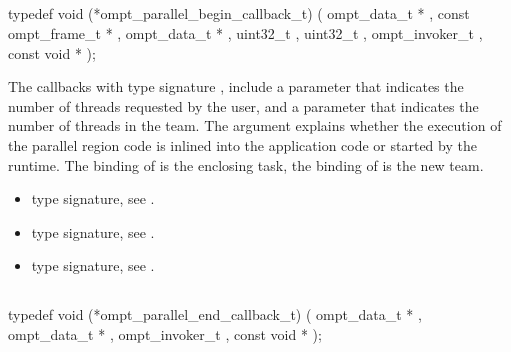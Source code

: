 \subsection{}
\label{subsec:ompt_parallel_begin_callback_t}
\format
\begin{boxedcode}
typedef void (*ompt\_parallel\_begin\_callback\_t) (
               ompt\_data\_t * ,
               const ompt\_frame\_t * ,
               ompt\_data\_t * ,
               uint32\_t ,
               uint32\_t ,
               ompt\_invoker\_t ,
               const void * 
);
\end{boxedcode}

\descr
The callbacks with type signature ,
include a parameter 
that indicates the number of threads requested by the user, and a parameter
 that indicates the number of threads in the team.
The  argument explains whether the execution of the parallel
region code is inlined into the application code or started by the runtime.
The binding of  is the enclosing task, the binding of
 is the new team.


\crossreferences
\begin{itemize}
\item {} type signature, see
.
\item {} type signature, see
.
\item {} type signature, see
.
\end{itemize}



\subsection{}
\label{subsec:ompt_parallel_end_callback_t}
\format
\begin{boxedcode}
typedef void (*ompt\_parallel\_end\_callback\_t) (
               ompt\_data\_t * ,
               ompt\_data\_t * ,
               ompt\_invoker\_t ,
               const void * 
);
\end{boxedcode}

